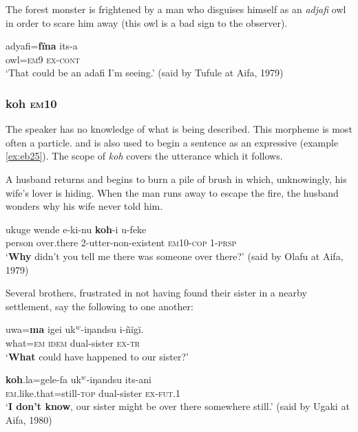 \documentclass[output=paper]{langsci/langscibook}
\begin{document}
The forest monster is frightened by a man who disguises himself as an \textit{adjafi} owl in order to scare him away (this owl is a bad sign to the observer).

\begin{exe}
	\ex \label{ex:eb23}
	\gll adyafi=\textbf{fïna} its-a\\
	owl=\textsc{em9} \textsc{ex-cont}\\
	\trans ‘That could be an adafi I’m seeing.’ (said by Tufule at Aifa, 1979)
\end{exe}

\subsubsection{koh \textsc{em}10}  
The speaker has no knowledge of what is being described. This morpheme is most often a particle. and is also used to begin a sentence as an expressive (example \ref{ex:eb25}). The scope of \textit{koh} covers the utterance which it follows.
  
A husband returns and begins to burn a pile of brush in which, unknowingly,  his wife’s lover is hiding. When the man runs away to escape the fire, the husband wonders why his wife never told him. 


\begin{exe}
	\ex \label{ex:eb24}
	\gll ukuge wende e-ki-nu \textbf{koh}-i u-feke\\
	person over.there 2-utter-non-existent \textsc{em10-cop} 1-\textsc{prsp}\\
	\trans ‘\textbf{Why} didn’t you tell me there was someone over there?' (said by Olafu at Aifa, 1979)
\end{exe}

Several brothers, frustrated in not having found their sister in a nearby settlement, say the following to one another:


\begin{exe}
	\ex \label{ex:eb25}
	\gll uwa=\textbf{ma} igei uk$^w$-iŋandsu i-ñïgï.\\ %
	what=\textsc{em} \textsc{idem} dual-sister \textsc{ex-tr}\\
	\trans ‘\textbf{What} could have happened to our sister?’
\end{exe}

\begin{exe}
	\ex \label{ex:eb26}
	\gll \textbf{koh}.la=gele-fa uk$^w$-iŋandsu its-ani\\
	\textsc{em}.like.that=still-\textsc{top} dual-sister \textsc{ex-fut.1}\\
	\trans `\textbf{I don’t know}, our sister might  be over there somewhere still.’ (said by Ugaki at Aifa, 1980)
\end{exe}
\end{document}
